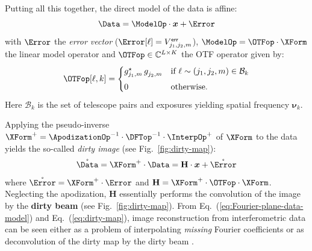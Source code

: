 \documentclass{article}
\newcommand{\vocab}[1]{\textbf{#1}}
\newcommand{\Tag}[1]{\mathsf{#1}}        %
\newcommand{\V}[1]{\boldsymbol{#1}}      %
\newcommand{\M}[1]{\mathbf{#1}}          %
\newcommand{\T}{^\mathrm{T}}             %
\newcommand{\Complexes}{\mathbb{C}}
\newcommand{\Eq}[1]{Eq.~(\ref{#1})}
\newcommand{\Fig}[1]{Fig.~\ref{#1}}
\newcommand{\ComplexVis}{V}
\newcommand{\Freq}{\nu}               %
\newcommand{\VFreq}{\V{\Freq}}
\newcommand{\Param}{x}
\newcommand{\VParam}{\V{\Param}}
\newcommand{\Gain}{g}
\newcommand{\BaseSet}{\mathcal{B}}  %
\newcommand{\ErrorTag}{\Tag{err}}
\begin{document}
Putting all this together, the direct model of the data is affine:
\begin{equation}
  \label{eq:Fourier-plane-data-model}
  \Data = \ModelOp\cdot\VParam + \Error
\end{equation}
with $\Error$ the \emph{error vector}
($\Error[\ell]=\ComplexVis_{j_1,j_2,m}^\ErrorTag$), $\ModelOp =
\OTFop\cdot\XForm$ the linear model operator and 
$\OTFop\in\Complexes^{L\times{}K}$ the OTF operator given by:
\begin{equation}
  \label{eq:otf}
  \OTFop[\ell,k] = 
  \begin{cases}
     \Gain_{j_1,m}^{\star} \, \Gain_{j_2,m}^{}
     & \text{if } \ell\sim(j_1,j_2,m) \in \BaseSet_k\\[1ex]
     0 & \text{otherwise.}
  \end{cases}
\end{equation}
Here $\BaseSet_k$ is the set of telescope pairs and exposures yielding
spatial frequency $\VFreq_k$.

Applying the pseudo-inverse $\XForm^{+} =
\ApodizationOp^{-1}\cdot\DFTop^{-1}\cdot\InterpOp^{+}$ of $\XForm$ to the data
yields the so-called \emph{dirty image} (see \Fig{fig:dirty-map}):
\begin{equation}
  \label{eq:dirty-map}
  \mathring{\Data} = \XForm^{+}\cdot\Data = \M{H}\cdot\VParam
  + \mathring{\Error}
\end{equation}
where $\mathring{\Error}=\XForm^{+}\cdot\Error$ and
$\M{H}=\XForm^{+}\cdot\OTFop\cdot\XForm$. Neglecting the apodization, $\M{H}$
essentially performs the convolution of the image by the \vocab{dirty beam}
(see \Fig{fig:dirty-map}).  From \Eq{eq:Fourier-plane-data-model} and
\Eq{eq:dirty-map}, image reconstruction from interferometric data can be seen
either as a problem of interpolating \emph{missing} Fourier coefficients or as
deconvolution of the dirty map by the dirty beam
\citep{Giovannelli_Coulais-2005-pos_mix}.
\end{document}
